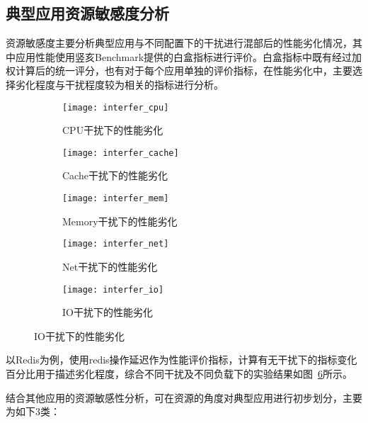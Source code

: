 \subsection{典型应用资源敏感度分析}

资源敏感度主要分析典型应用与不同配置下的干扰进行混部后的性能劣化情况，其中应用性能使用竖亥Benchmark提供的白盒指标进行评价。白盒指标中既有经过加权计算后的统一评分，也有对于每个应用单独的评价指标，在性能劣化中，主要选择劣化程度与干扰程度较为相关的指标进行分析。

\begin{figure}[H]
    \centering
    \begin{subfigure}[b]{0.32\textwidth}
        \texttt{[image: interfer\_cpu]}
        \caption{CPU干扰下的性能劣化}
        \label{fig:interfer_cpu}
    \end{subfigure}
    \begin{subfigure}[b]{0.32\textwidth}
      \texttt{[image: interfer\_cache]}
      \caption{Cache干扰下的性能劣化}
      \label{fig:interfer_cache}
    \end{subfigure}
    \begin{subfigure}[b]{0.32\textwidth}
        \texttt{[image: interfer\_mem]}
        \caption{Memory干扰下的性能劣化}
        \label{fig:interfer_mem}
    \end{subfigure}
    \begin{subfigure}[b]{0.32\textwidth}
        \texttt{[image: interfer\_net]}
        \caption{Net干扰下的性能劣化}
        \label{fig:interfer_net}
    \end{subfigure}
    \begin{subfigure}[b]{0.32\textwidth}
        \texttt{[image: interfer\_io]}
        \caption{IO干扰下的性能劣化}
        \label{fig:interfer_io}
    \end{subfigure}

\label{fig:redis_interf_sensitivity}
\end{figure}

以Redis为例，使用redis操作延迟作为性能评价指标，计算有无干扰下的指标变化百分比用于描述劣化程度，综合不同干扰及不同负载下的实验结果如图~\ref{fig:redis_interf_sensitivity}所示。

结合其他应用的资源敏感性分析，可在资源的角度对典型应用进行初步划分，主要为如下3类：

